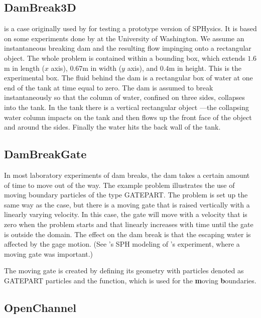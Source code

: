 \documentclass[12pt]{memoir}
\begin{document}
\subsection{DamBreak3D}

 is a case originally used by
\cite{gomez-gesteira_using_2004}
for testing a prototype version of SPHysics. It is based on some
experiments done by \cite{arnason_interactions_2005} at the University of Washington.
We assume an instantaneous breaking dam and the resulting flow impinging
onto a rectangular object. The whole problem is contained within a
bounding box, which extends $1.6$m in length ($x$ axis), $0.67$m in
width ($y$ axis), and $0.4$m in height. This is the experimental box.
The fluid behind the dam is a rectangular box of water at one end of the
tank at time equal to zero. The dam is assumed to break instantaneously
so that the column of water, confined on three sides, collapses into the
tank. In the tank there is a vertical rectangular object ---the
collapsing water column impacts on the tank and then flows up the front
face of the object and around the sides. Finally the water hits the back
wall of the tank.

\subsection{DamBreakGate}

In most laboratory experiments of dam breaks, the dam takes a certain
amount of time to move out of the way. The example problem
 illustrates the use of moving boundary particles of
the type GATEPART. The problem is set up the same way as the
 case, but there is a moving gate that is raised
vertically with a linearly varying velocity. In this case, the gate will
move with a velocity that is zero when the problem starts and that
linearly increases with time until the gate is outside the domain. The
effect on the dam break is that the escaping water is affected by the
gage motion. (See \cite{crespo_modeling_2008}'s SPH modeling of
\cite{janosi_turbulent_2004}'s experiment, where a moving gate was important.)

The moving gate is created by defining its geometry with particles
denoted as GATEPART particles and the  function, which
is used for the \textbf{m}oving \textbf{b}oundaries.

\subsection{OpenChannel}
\end{document}
